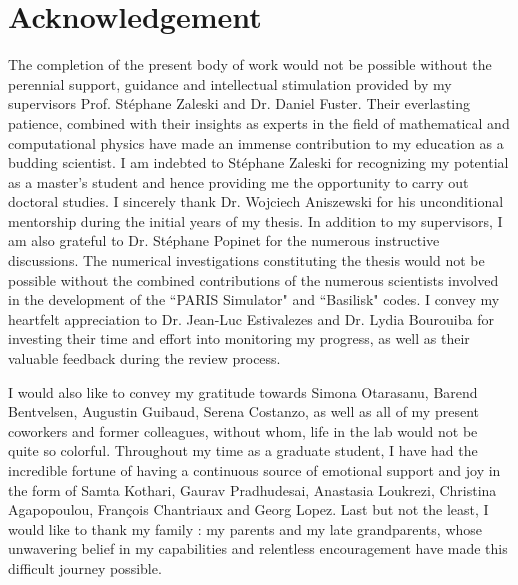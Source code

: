 \chapter*{Acknowledgement}

The completion of the present body of work would not be possible without the perennial support, guidance and intellectual stimulation provided by my supervisors Prof. St\'ephane Zaleski and Dr. Daniel Fuster. Their everlasting patience, combined with their insights as experts in the field of mathematical and computational physics have made an immense contribution to my education as a budding scientist. I am indebted to St\'ephane Zaleski for recognizing my potential as a master's student and hence providing me the opportunity to carry out doctoral studies. I sincerely thank Dr. Wojciech Aniszewski for his unconditional mentorship during the initial years of my thesis. In addition to my supervisors, I am also grateful to Dr. St\'ephane Popinet for the numerous instructive discussions. The numerical investigations constituting the thesis would not be possible without the combined contributions of the numerous scientists involved in the development of the ``PARIS Simulator" and ``Basilisk" codes. I convey my heartfelt appreciation to Dr. Jean-Luc Estivalezes and Dr. Lydia Bourouiba for investing their time and effort into monitoring my progress, as well as their valuable feedback during the review process.  

I would also like to convey my gratitude towards Simona Otarasanu, Barend Bentvelsen, Augustin Guibaud, Serena Costanzo, as well as all of my present coworkers and former colleagues, without whom, life in the lab would not be quite so colorful. Throughout my time as a graduate student, I have had the incredible fortune of having a continuous source of emotional support and joy in the form of Samta Kothari, Gaurav Pradhudesai, Anastasia Loukrezi, Christina Agapopoulou, François Chantriaux and Georg Lopez.  
Last but not the least, I would like to thank my family : my parents and my late grandparents, whose unwavering belief in my capabilities and relentless encouragement have made this difficult journey possible.    

